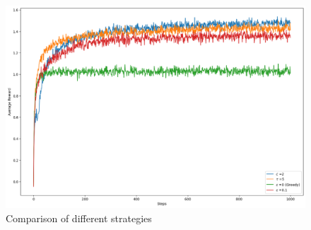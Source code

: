 \begin{figure}[H]
    \begin{minipage}{\linewidth}
        \centering
     \includegraphics[width=\linewidth, height=0.33\textheight]{images/bandit_comparison.png}
    \caption{Comparison of different strategies}
    \end{minipage}
    
    \label{fig:three-methods}
\end{figure}